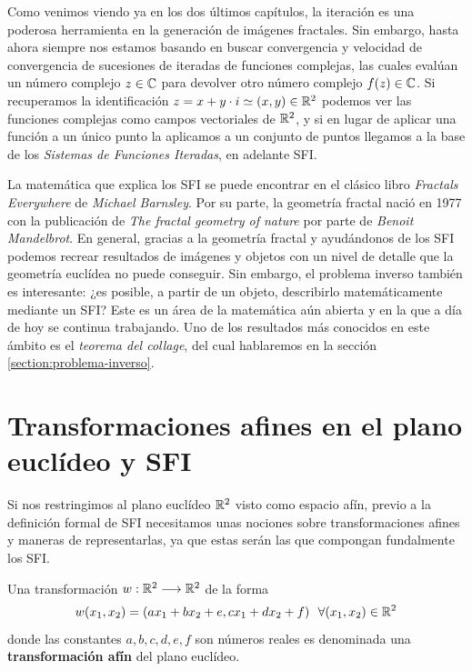 
Como venimos viendo ya en los dos últimos capítulos, la iteración es una poderosa herramienta en la generación de imágenes fractales. Sin embargo, hasta ahora siempre nos estamos basando en buscar convergencia y velocidad de convergencia de sucesiones de iteradas de funciones complejas, las cuales evalúan un número complejo $z\in\mathbb{C}$ para devolver otro número complejo $f(z)\in\mathbb{C}$. Si recuperamos la identificación $z=x+y\cdot i\simeq (x,y)\in\mathbb{R}^2$ podemos ver las funciones complejas como campos vectoriales de $\mathbb{R}^2$, y si en lugar de aplicar una función a un único punto la aplicamos a un conjunto de puntos llegamos a la base de los \textit{Sistemas de Funciones Iteradas}, en adelante SFI. 

La matemática que explica los SFI se puede encontrar en el clásico libro \textit{Fractals Everywhere} \cite{Barnsley} de \textit{Michael Barnsley}. Por su parte, la geometría fractal nació en 1977 con la publicación de \textit{The fractal geometry of nature} \cite{alma991007242979704990} por parte de \textit{Benoit Mandelbrot}. En general, gracias a la geometría fractal y ayudándonos de los SFI podemos recrear resultados de imágenes y objetos con un nivel de detalle que la geometría euclídea no puede conseguir. Sin embargo, el problema inverso también es interesante: ¿es posible, a partir de un objeto, describirlo matemáticamente mediante un SFI? Este es un área de la matemática aún abierta y en la que a día de hoy se continua trabajando. Uno de los resultados más conocidos en este ámbito es el \textit{teorema del collage}, del cual hablaremos en la sección \ref{section:problema-inverso}.

\section{Transformaciones afines en el plano euclídeo y SFI}

Si nos restringimos al plano euclídeo $\mathbb{R}^2$ visto como espacio afín, previo a la definición formal de SFI necesitamos unas nociones sobre transformaciones afines y maneras de representarlas, ya que estas serán las que compongan fundalmente los SFI.

\begin{definicion}
    Una transformación $w:\mathbb{R}^2\longrightarrow\mathbb{R}^2$ de la forma
    \begin{equation}
        w(x_1,x_2)=(ax_1+bx_2+e,cx_1+dx_2+f) \ \ \forall (x_1,x_2)\in\mathbb{R}^2
    \end{equation}
    donde las constantes $a,b,c,d,e,f$ son números reales es denominada una \textbf{transformación afín} del plano euclídeo.
\end{definicion}


